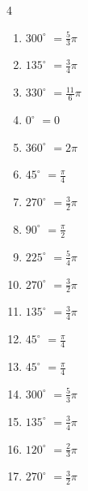 \begin{multicols}{4}
\begin{enumerate}
  \item $\displaystyle 300^{\circ}$
        $\displaystyle =\frac{5}{3}\pi$

  \item $\displaystyle 135^{\circ}$
        $\displaystyle =\frac{3}{4}\pi$

  \item $\displaystyle 330^{\circ}$
        $\displaystyle =\frac{11}{6}\pi$

  \item $\displaystyle 0^{\circ}$
        $\displaystyle =0$

  \item $\displaystyle 360^{\circ}$
        $\displaystyle =2\pi$

\columnbreak %

  \item $\displaystyle 45^{\circ}$
        $\displaystyle =\frac{\pi}{4}$

  \item $\displaystyle 270^{\circ}$
        $\displaystyle =\frac{3}{2}\pi$

  \item $\displaystyle 90^{\circ}$
        $\displaystyle =\frac{\pi}{2}$

  \item $\displaystyle 225^{\circ}$
        $\displaystyle =\frac{5}{4}\pi$

  \item $\displaystyle 270^{\circ}$
        $\displaystyle =\frac{3}{2}\pi$

  \item $\displaystyle 135^{\circ}$
        $\displaystyle =\frac{3}{4}\pi$

  \item $\displaystyle 45^{\circ}$
        $\displaystyle =\frac{\pi}{4}$

  \item $\displaystyle 45^{\circ}$
        $\displaystyle =\frac{\pi}{4}$

  \item $\displaystyle 300^{\circ}$
        $\displaystyle =\frac{5}{3}\pi$

  \item $\displaystyle 135^{\circ}$
        $\displaystyle =\frac{3}{4}\pi$

  \item $\displaystyle 120^{\circ}$
        $\displaystyle =\frac{2}{3}\pi$

  \item $\displaystyle 270^{\circ}$
        $\displaystyle =\frac{3}{2}\pi$


\end{enumerate}
\end{multicols}
